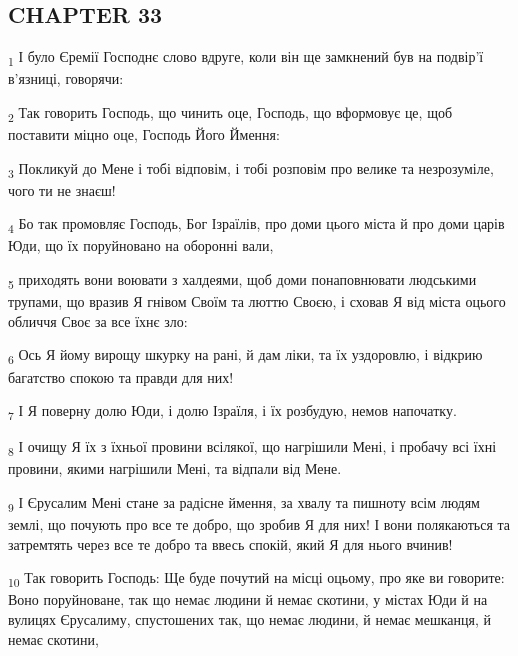 \subsection{CHAPTER 33}
\begin{tcolorbox}
\textsubscript{1} І було Єремії Господнє слово вдруге, коли він ще замкнений був на подвір'ї в'язниці, говорячи:
\end{tcolorbox}
\begin{tcolorbox}
\textsubscript{2} Так говорить Господь, що чинить оце, Господь, що вформовує це, щоб поставити міцно оце, Господь Його Ймення:
\end{tcolorbox}
\begin{tcolorbox}
\textsubscript{3} Покликуй до Мене і тобі відповім, і тобі розповім про велике та незрозуміле, чого ти не знаєш!
\end{tcolorbox}
\begin{tcolorbox}
\textsubscript{4} Бо так промовляє Господь, Бог Ізраїлів, про доми цього міста й про доми царів Юди, що їх поруйновано на оборонні вали,
\end{tcolorbox}
\begin{tcolorbox}
\textsubscript{5} приходять вони воювати з халдеями, щоб доми понаповнювати людськими трупами, що вразив Я гнівом Своїм та люттю Своєю, і сховав Я від міста оцього обличчя Своє за все їхнє зло:
\end{tcolorbox}
\begin{tcolorbox}
\textsubscript{6} Ось Я йому вирощу шкурку на рані, й дам ліки, та їх уздоровлю, і відкрию багатство спокою та правди для них!
\end{tcolorbox}
\begin{tcolorbox}
\textsubscript{7} І Я поверну долю Юди, і долю Ізраїля, і їх розбудую, немов напочатку.
\end{tcolorbox}
\begin{tcolorbox}
\textsubscript{8} І очищу Я їх з їхньої провини всілякої, що нагрішили Мені, і пробачу всі їхні провини, якими нагрішили Мені, та відпали від Мене.
\end{tcolorbox}
\begin{tcolorbox}
\textsubscript{9} І Єрусалим Мені стане за радісне ймення, за хвалу та пишноту всім людям землі, що почують про все те добро, що зробив Я для них! І вони полякаються та затремтять через все те добро та ввесь спокій, який Я для нього вчинив!
\end{tcolorbox}
\begin{tcolorbox}
\textsubscript{10} Так говорить Господь: Ще буде почутий на місці оцьому, про яке ви говорите: Воно поруйноване, так що немає людини й немає скотини, у містах Юди й на вулицях Єрусалиму, спустошених так, що немає людини, й немає мешканця, й немає скотини,
\end{tcolorbox}
